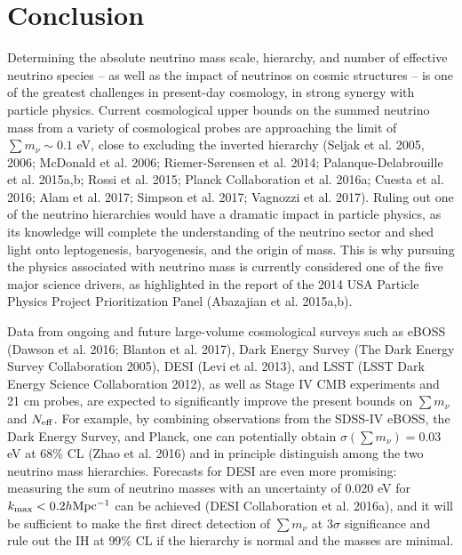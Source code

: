 \documentclass{emulateapj}
\begin{document}
 

\section{Conclusion} \label{section_conclusion}

Determining the absolute neutrino mass scale, hierarchy, and number of effective neutrino species -- as well as the impact of neutrinos on cosmic structures -- 
is one of the greatest challenges in present-day cosmology, in strong synergy with particle physics. 
Current cosmological upper bounds on the summed neutrino mass from a variety of cosmological probes are approaching the limit of $\sum m_{\nu} \sim 0.1$ eV,  
close to excluding the inverted hierarchy (Seljak et al. 2005, 2006; McDonald et al. 2006; Riemer-S{\o}rensen et al. 2014; Palanque-Delabrouille et al. 2015a,b; Rossi et al. 2015; 
Planck Collaboration et al. 2016a; Cuesta et al. 2016;   Alam et al. 2017; Simpson et al. 2017; Vagnozzi et al. 2017). 
Ruling out one of the neutrino hierarchies would have a dramatic impact in particle physics, as its knowledge will complete the understanding of the neutrino sector and shed light onto 
leptogenesis, baryogenesis, and the origin of mass. 
This is why pursuing the physics associated with neutrino mass is currently considered one of the five major science drivers, as highlighted in the report of the 2014 USA Particle Physics Project Prioritization Panel 
(Abazajian et al. 2015a,b).

Data from ongoing and future large-volume cosmological surveys such as  eBOSS (Dawson et al. 2016; Blanton et al. 2017), Dark Energy Survey (The Dark Energy Survey Collaboration 2005), 
DESI (Levi et al. 2013), and LSST (LSST Dark Energy Science Collaboration 2012), as well as Stage IV CMB experiments  and 21 cm probes,
are expected to significantly  improve the present bounds on $\sum m_{\nu}$ and $N_{\rm eff}$.
For example, by combining observations from the SDSS-IV
eBOSS, the Dark Energy Survey, and Planck,
one can potentially obtain $\sigma(\sum m_{\nu})=0.03$ eV at 68\% CL (Zhao et al. 2016) and in principle  distinguish among the two neutrino mass hierarchies.
Forecasts for DESI are even more promising:  
measuring the sum of neutrino masses
with an uncertainty of 0.020 eV for $k_{\rm max} < 0.2 h {\rm Mpc^{-1}}$ can be achieved (DESI Collaboration et al. 2016a), and it will be sufficient
to make the first direct detection of $\sum m_{\nu}$ at $3\sigma$ significance and rule out the IH at $99\%$ CL if the hierarchy is
normal and the masses are minimal. 
 
\end{document}
